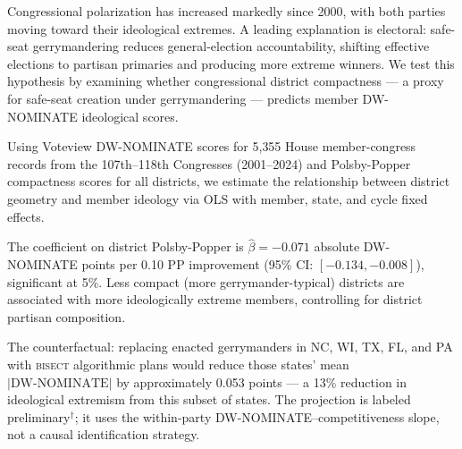 Congressional polarization has increased markedly since 2000, with both parties
moving toward their ideological extremes.
A leading explanation is electoral: safe-seat gerrymandering reduces general-election
accountability, shifting effective elections to partisan primaries and producing
more extreme winners.
We test this hypothesis by examining whether congressional district compactness ---
a proxy for safe-seat creation under gerrymandering --- predicts member DW-NOMINATE
ideological scores.

Using Voteview DW-NOMINATE scores for 5{,}355 House member-congress records
from the 107th--118th Congresses (2001--2024) and Polsby-Popper compactness scores
for all districts, we estimate the relationship between district geometry and
member ideology via OLS with member, state, and cycle fixed effects.

The coefficient on district Polsby-Popper is $\hat\beta = -0.071$ absolute
DW-NOMINATE points per 0.10 PP improvement (95\% CI: $[-0.134, -0.008]$),
significant at 5\%.
Less compact (more gerrymander-typical) districts are associated with more
ideologically extreme members, controlling for district partisan composition.

The counterfactual: replacing enacted gerrymanders in NC, WI, TX, FL, and PA
with \textsc{bisect} algorithmic plans would reduce those states' mean
$|\text{DW-NOMINATE}|$ by approximately 0.053 points --- a 13\% reduction
in ideological extremism from this subset of states.
The projection is labeled preliminary${}^\dagger$; it uses the within-party
DW-NOMINATE--competitiveness slope, not a causal identification strategy.
